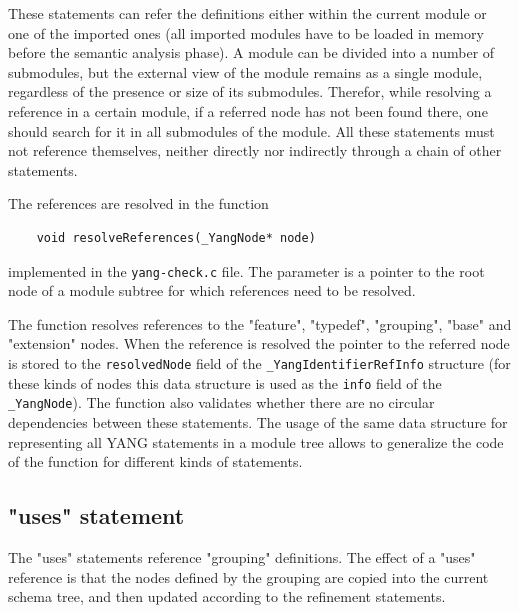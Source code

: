 \documentclass[conference]{IEEEtran}
\begin{document}
These statements can refer the definitions either within the current module or one of the imported ones (all imported modules have to be loaded in memory before the semantic analysis phase). 
A module can be divided into a number of submodules, but the external view of the module remains as a single module, regardless of the presence or size of its submodules. 
Therefor, while resolving a reference in a certain module, if a referred node has not been found there, one should search for it in all submodules of the module.
All these statements must not reference themselves, neither directly nor indirectly through a chain of other statements.

The references are resolved in the function
\small
\begin{verbatim}
    void resolveReferences(_YangNode* node)
\end{verbatim}
\normalsize
implemented in the \texttt{yang-check.c} file. The parameter is a pointer to the root node of a module subtree for which references need to be resolved.

The function resolves references to the "feature", "typedef", "grouping", "base" and "extension" nodes. 
When the reference is resolved the pointer to the referred node is stored to the \texttt{resolvedNode} field of the \texttt{\_YangIdentifierRefInfo} structure 
(for these kinds of nodes this data structure is used as the \texttt{info} field of the \texttt{\_YangNode}). 
The function also validates whether there are no circular dependencies between these statements. The usage of the same data structure for representing
all YANG statements in a module tree allows to generalize the code of the function for different kinds of statements.  

\subsection{"uses" statement}
The "uses" statements reference "grouping" definitions. The effect of a "uses" reference is that the nodes
defined by the grouping are copied into the current schema tree, and then updated according to the refinement statements.
\end{document}
